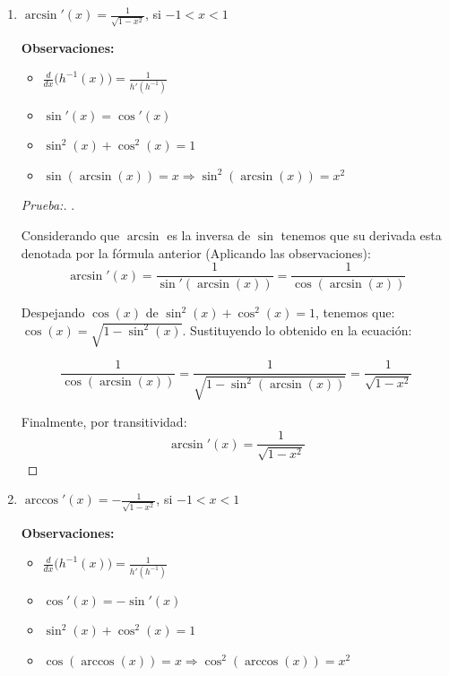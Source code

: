 \documentclass[12pt]{article}
\begin{document}
\begin{enumerate}[\hspace{9px} a)]
    \item \(\arcsin'(x)=\displaystyle\frac{1}{\sqrt{1-x^2}}\), si \(-1<x<1\) \bigskip
    
        \textbf{Observaciones:}
        \begin{itemize}
            \item \(\displaystyle\frac{d}{dx}\big(h^{-1}(x)\big) = \frac{1}{h'(h^{-1})}\)
            \item \(\sin'(x) = \cos'(x)\)
            \item \(\sin^2(x)+\cos^2(x)=1\)
            \item \(\sin(\arcsin(x))=x \Longrightarrow \sin^2(\arcsin(x))=x^2\)
        \end{itemize}

        \begin{proof}[Prueba:]
            . \medskip

            Considerando que $\arcsin$ es la inversa de $\sin$ tenemos que su derivada esta denotada por la f\'ormula anterior (Aplicando las observaciones):
            \[\arcsin'(x) = \frac{1}{\sin'(\arcsin(x))} = \frac{1}{\cos(\arcsin(x))}\]

            Despejando \(\cos(x)\) de \(\sin^2(x)+\cos^2(x)=1\), tenemos que: \(\cos(x) = \sqrt{1-\sin^2(x)}\). Sustituyendo lo obtenido en la ecuaci\'on:

            \[\frac{1}{\cos(\arcsin(x))} = \frac{1}{\sqrt{1-\sin^2(\arcsin(x))}} = \frac{1}{\sqrt{1-x^2}}\]

            Finalmente, por transitividad:
            \[\arcsin'(x) = \frac{1}{\sqrt{1-x^2}}\]
        \end{proof}

    \item \(\arccos'(x)=\displaystyle-\frac{1}{\sqrt{1-x^2}}\), si \(-1<x<1\) \bigskip
    
        \textbf{Observaciones:}
        \begin{itemize}
            \item \(\displaystyle\frac{d}{dx}\big(h^{-1}(x)\big) = \frac{1}{h'(h^{-1})}\)
            \item \(\cos'(x) = -\sin'(x)\)
            \item \(\sin^2(x)+\cos^2(x)=1\)
            \item \(\cos(\arccos(x))=x \Longrightarrow \cos^2(\arccos(x))=x^2\)
        \end{itemize}


\end{enumerate}
\end{document}
